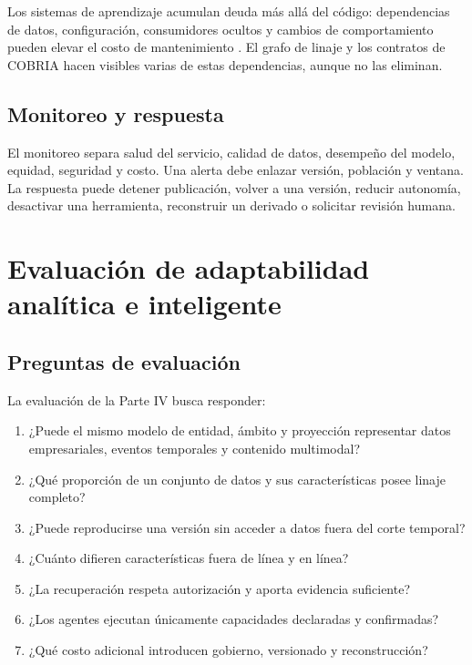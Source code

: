 Los sistemas de aprendizaje acumulan deuda más allá del código: dependencias de datos,
configuración, consumidores ocultos y cambios de comportamiento pueden elevar el costo
de mantenimiento \parencite{sculley2015debt}. El grafo de linaje y los contratos de
COBRIA hacen visibles varias de estas dependencias, aunque no las eliminan.

\section{Monitoreo y respuesta}

El monitoreo separa salud del servicio, calidad de datos, desempeño del modelo, equidad,
seguridad y costo. Una alerta debe enlazar versión, población y ventana. La respuesta
puede detener publicación, volver a una versión, reducir autonomía, desactivar una
herramienta, reconstruir un derivado o solicitar revisión humana.

\chapter{Evaluación de adaptabilidad analítica e inteligente}

\section{Preguntas de evaluación}

La evaluación de la Parte IV busca responder:

\begin{enumerate}[leftmargin=*]
  \item ¿Puede el mismo modelo de entidad, ámbito y proyección representar datos
  empresariales, eventos temporales y contenido multimodal?
  \item ¿Qué proporción de un conjunto de datos y sus características posee linaje completo?
  \item ¿Puede reproducirse una versión sin acceder a datos fuera del corte temporal?
  \item ¿Cuánto difieren características fuera de línea y en línea?
  \item ¿La recuperación respeta autorización y aporta evidencia suficiente?
  \item ¿Los agentes ejecutan únicamente capacidades declaradas y confirmadas?
  \item ¿Qué costo adicional introducen gobierno, versionado y reconstrucción?
\end{enumerate}

